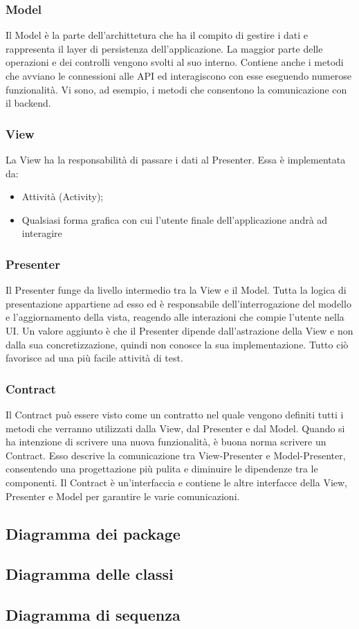\subsubsection{Model}
Il Model è la parte dell'archittetura che ha il compito di gestire i dati e rappresenta il layer di persistenza dell'applicazione. La maggior parte delle operazioni e dei controlli vengono svolti al suo interno. Contiene anche i metodi che avviano le connessioni alle API ed interagiscono con esse eseguendo numerose funzionalità. Vi sono, ad esempio, i metodi che consentono la comunicazione con il backend.


\subsubsection{View}
La View ha la responsabilità di passare i dati al Presenter. Essa è implementata da:
\begin{itemize}
	\item Attività (Activity); \\
	\item Qualsiasi forma grafica con cui l'utente finale dell'applicazione andrà ad interagire \\	
\end{itemize}

\subsubsection{Presenter}
Il Presenter funge da livello intermedio tra la View e il Model. Tutta la logica di presentazione appartiene ad esso ed è responsabile dell'interrogazione del modello e l'aggiornamento della vista, reagendo alle interazioni che compie l'utente nella UI. Un valore aggiunto è che il Presenter dipende dall'astrazione della View e non dalla sua concretizzazione, quindi non conosce la sua implementazione. Tutto ciò favorisce ad una più facile attività di test.

\subsubsection{Contract}
Il Contract può essere visto come un contratto nel quale vengono definiti tutti i metodi che verranno utilizzati dalla View, dal Presenter e dal Model. Quando si ha intenzione di scrivere una nuova funzionalità, è buona norma scrivere un Contract. Esso descrive la comunicazione tra View-Presenter e Model-Presenter, consentendo una progettazione più pulita e diminuire le dipendenze tra le componenti.
Il Contract è un'interfaccia e contiene le altre interfacce della View, Presenter e Model per garantire le varie comunicazioni.

\subsection{Diagramma dei package}

\subsection{Diagramma delle classi}

\subsection{Diagramma di sequenza}
